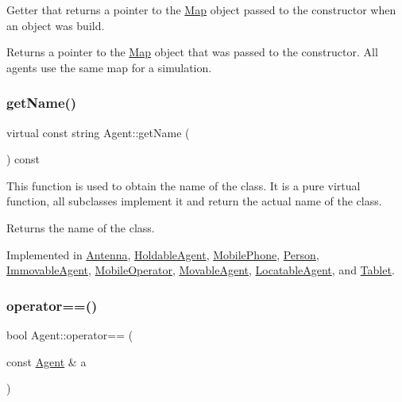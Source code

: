 Getter that returns a pointer to the \mbox{\hyperlink{class_map}{Map}} object passed to the constructor when an object was build. \begin{DoxyReturn}{Returns}
a pointer to the \mbox{\hyperlink{class_map}{Map}} object that was passed to the constructor. All agents use the same map for a simulation. 
\end{DoxyReturn}
\mbox{\label{class_agent_afe6c72d91baf9ee4fe77ea1ed7fef3ba}} 
\subsubsection{\texorpdfstring{getName()}{getName()}}
{\footnotesize\ttfamily virtual const string Agent\+::get\+Name (\begin{DoxyParamCaption}{ }\end{DoxyParamCaption}) const\hspace{0.3cm}{\ttfamily [pure virtual]}}

This function is used to obtain the name of the class. It is a pure virtual function, all subclasses implement it and return the actual name of the class. \begin{DoxyReturn}{Returns}
the name of the class. 
\end{DoxyReturn}


Implemented in \mbox{\hyperlink{class_antenna_a4ad9da1ca9d79f20b331c22b94c57a02}{Antenna}}, \mbox{\hyperlink{class_holdable_agent_ab330bb40de51a957ef8826af629f94a2}{Holdable\+Agent}}, \mbox{\hyperlink{class_mobile_phone_a1eeac3141baafa75ebcf26fc3a0e4068}{Mobile\+Phone}}, \mbox{\hyperlink{class_person_aa2a6f8d7f1d94045a03ca578f2ed272c}{Person}}, \mbox{\hyperlink{class_immovable_agent_ae8fbccc744f6f806e47dfd242fa67a1c}{Immovable\+Agent}}, \mbox{\hyperlink{class_mobile_operator_a2b4538d96f7aa898e6e470411d40cbf7}{Mobile\+Operator}}, \mbox{\hyperlink{class_movable_agent_abcc1218876c39c996f2cb1eba2b96379}{Movable\+Agent}}, \mbox{\hyperlink{class_locatable_agent_a754105958bb672744b525538f1584a7b}{Locatable\+Agent}}, and \mbox{\hyperlink{class_tablet_adc7196aaee1e9714236b7cd8825d5826}{Tablet}}.

\mbox{\label{class_agent_afa2b3a408bb0694aea46fb2bb59bacf7}} 
\subsubsection{\texorpdfstring{operator==()}{operator==()}}
{\footnotesize\ttfamily bool Agent\+::operator== (\begin{DoxyParamCaption}\item[{const \mbox{\hyperlink{class_agent}{Agent}} \&}]{a }\end{DoxyParamCaption})}

